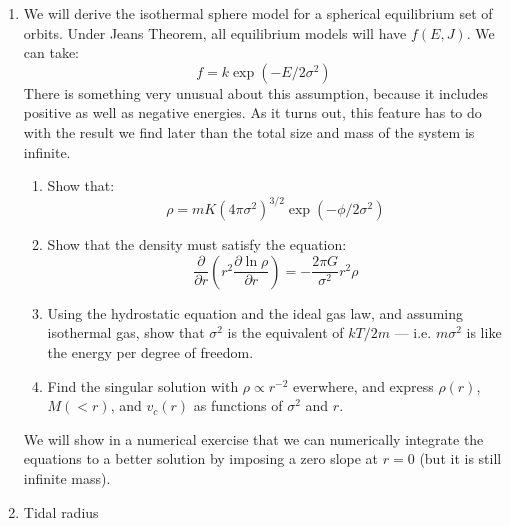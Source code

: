 \begin{enumerate}
\begin{enumerate}
\end{enumerate}
\item We will derive the isothermal sphere model for a spherical
equilibrium set of orbits. Under Jeans Theorem, all equilibrium models
will have $f(E,J)$.  We can take:
\begin{equation}
f = 
k \exp\left(-E/2\sigma^2\right)
\end{equation}
There is something very unusual about this assumption, because it
includes positive as well as negative energies. As it turns out, this
feature has to do with the result we find later than the total size
and mass of the system is infinite. 
\begin{enumerate}
\item Show that:
\begin{equation}
\rho = m K \left(4\pi\sigma^2\right)^{3/2} \exp\left(-\phi/2 \sigma^2\right)
\end{equation}
\item Show that the density must satisfy the equation:
\begin{equation}
\label{eq:lane-emden}
\frac{\partial}{\partial
r} \left(r^2 \frac{\partial \ln \rho}{\partial r} \right) =
- \frac{2\pi G}{\sigma^2} r^2 \rho
\end{equation}
\item Using the hydrostatic equation and the ideal gas law, and
assuming isothermal gas, show that $\sigma^2$ is the equivalent of
$kT/2m$ --- i.e. $m\sigma^2$ is like the energy per degree of freedom.
\item Find the singular solution with $\rho\propto r^{-2}$ everwhere,
and express $\rho(r)$, $M(<r)$, and $v_c(r)$ as functions of
$\sigma^2$ and $r$.
\end{enumerate}
We will show in a  numerical exercise that we can numerically integrate
the equations to a better solution by imposing a zero slope at $r=0$
(but it is still infinite mass).
\item Tidal radius


\end{enumerate}

